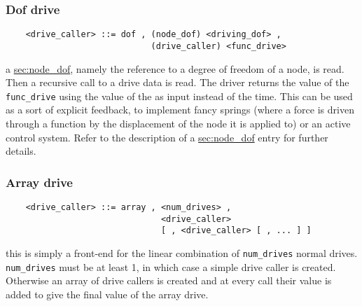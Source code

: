 \subsubsection{Dof drive}\label{sec:DOF-DRIVE-CALLER}
\begin{verbatim}
    <drive_caller> ::= dof , (node_dof) <driving_dof> ,
                             (drive_caller) <func_drive>
\end{verbatim}
a \hyperref{\texttt{node\_dof}}{\texttt{node\_dof} (see Section~}{)}{sec:node_dof}, 
namely the reference to a degree of freedom of a node, is read. 
Then a recursive call to a drive data is read. 
The driver returns the value of the \texttt{func\_drive} 
 using the value of the 
 as input instead of the time. 
This can be used as a sort of explicit feedback, to implement fancy
springs (where a force is driven through a function by the displacement
of the node it is applied to) or an active control system. 
Refer to the description of a 
\hyperref{\texttt{node\_dof}}{\texttt{node\_dof} (see Section~}{)}{sec:node_dof} 
entry for further details.

\subsubsection{Array drive}
\begin{verbatim}
    <drive_caller> ::= array , <num_drives> ,
                               <drive_caller> 
                               [ , <drive_caller> [ , ... ] ]
\end{verbatim}
this is simply a front-end for the linear combination of \texttt{num\_drives} 
normal drives. \\
\texttt{num\_drives} must be at least 1, in which case a simple drive
caller is created. 
Otherwise an array of drive callers is created and at every call their value 
is added to give the final value of the array drive.

